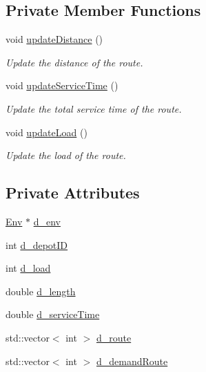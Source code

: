 \subsection*{Private Member Functions}
\begin{DoxyCompactItemize}
\item 
\mbox{\label{class_route_ae6800543f5a50db543e1315e6a5468cd}} 
void \hyperlink{class_route_ae6800543f5a50db543e1315e6a5468cd}{update\+Distance} ()
\begin{DoxyCompactList}\small\item\em Update the distance of the route. \end{DoxyCompactList}\item 
\mbox{\label{class_route_a8054b36d0db39ba9321d30ed2410e138}} 
void \hyperlink{class_route_a8054b36d0db39ba9321d30ed2410e138}{update\+Service\+Time} ()
\begin{DoxyCompactList}\small\item\em Update the total service time of the route. \end{DoxyCompactList}\item 
\mbox{\label{class_route_a3f6ad4d322826950910265ea7b6c29c6}} 
void \hyperlink{class_route_a3f6ad4d322826950910265ea7b6c29c6}{update\+Load} ()
\begin{DoxyCompactList}\small\item\em Update the load of the route. \end{DoxyCompactList}\end{DoxyCompactItemize}
\subsection*{Private Attributes}
\begin{DoxyCompactItemize}
\item 
\hyperlink{class_env}{Env} $\ast$ \hyperlink{class_route_a864524c91fba2fc3ad77f72758e15463}{d\+\_\+env}
\item 
int \hyperlink{class_route_afb10c7df94462df3425c5fe19148124d}{d\+\_\+depot\+ID}
\item 
int \hyperlink{class_route_a718e90948453ba308e72da01c38023e6}{d\+\_\+load}
\item 
double \hyperlink{class_route_a229ec36dcf99986891d1b306f82e457f}{d\+\_\+length}
\item 
double \hyperlink{class_route_a4c644f09b64e56e5d523e3177639b7fe}{d\+\_\+service\+Time}
\item 
std\+::vector$<$ int $>$ \hyperlink{class_route_ab18028e7736ff42aab699f254e7feda1}{d\+\_\+route}
\item 
std\+::vector$<$ int $>$ \hyperlink{class_route_a1c4627e94479ee1f587999c4e33e85e8}{d\+\_\+demand\+Route}
\end{DoxyCompactItemize}

